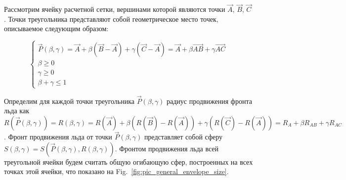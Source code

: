 \documentclass[
11pt,%
tightenlines,%
twoside,%
onecolumn,%
nofloats,%
nobibnotes,%
nofootinbib,%
superscriptaddress,%
noshowpacs,%
centertags]%
{revtex4}
\begin{document}
Рассмотрим ячейку расчетной сетки, вершинами которой являются точки $\vec{A}$, $\vec{B}$, $\vec{C}$.
Точки треугольника представляют собой геометрическое место точек, описываемое следующим образом:

\begin{equation}
\begin{cases}
\vec{P}(\beta, \gamma) = \vec{A} + \beta (\vec{B} - \vec{A}) + \gamma (\vec{C} - \vec{A}) = \vec{A} + \beta \vec{AB} + \gamma \vec{AC} \\
\beta \ge 0 \\
\gamma \ge 0 \\
\beta + \gamma \le 1
\end{cases}
\end{equation}

Определим для каждой точки треугольника $\vec{P}(\beta, \gamma)$ радиус продвижения фронта льда как $R(\vec{P}(\beta, \gamma)) = R(\beta, \gamma) = R(\vec{A}) + \beta (R(\vec{B}) - R(\vec{A})) + \gamma (R(\vec{C}) - R(\vec{A})) = R_A + \beta R_{AB} + \gamma R_{AC}$.
Фронт продвижения льда от точки $\vec{P}(\beta, \gamma)$ представляет собой сферу $S(\beta, \gamma) = S(\vec{P}(\beta, \gamma), R(\beta, \gamma))$.
Фронтом продвижения льда всей треугольной ячейки будем считать общую огибающую сфер, построенных на всех точках этой ячейки, что показано на Fig.~\ref{fig:pic_general_envelope_size}.
\end{document}
